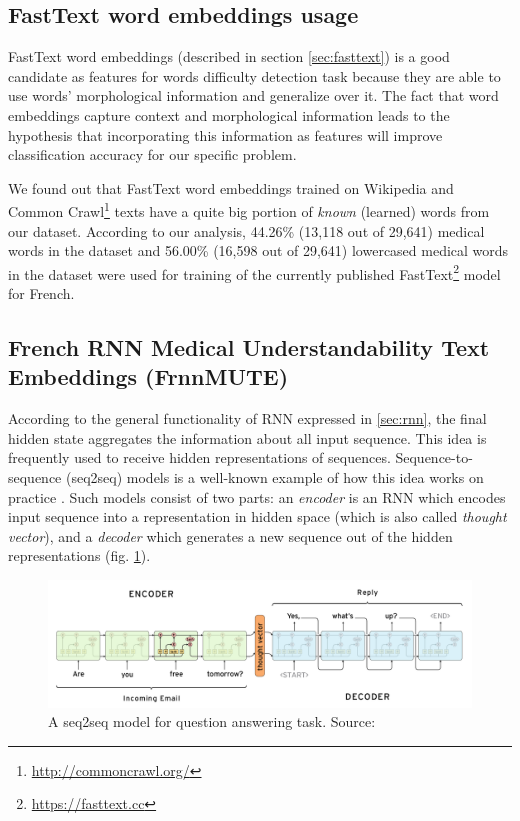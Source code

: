 \subsection{FastText word embeddings usage}

FastText word embeddings (described in section \ref{sec:fasttext}) is a good candidate as features for words difficulty detection task because they are able to use words' morphological information and generalize over it. The fact that word embeddings capture context and morphological information leads to the hypothesis that incorporating this information as features will improve classification accuracy for our specific problem. 

We found out that FastText word embeddings trained on Wikipedia and Common Crawl\footnote{\url{http://commoncrawl.org/}} texts have a quite big portion of \textit{known} (learned) words from our dataset.
According to our analysis, 44.26\% (13,118 out of 29,641) medical words in the dataset and 56.00\% (16,598 out of 29,641) lowercased medical words in the dataset were used for training of the currently published FastText\footnote{\url{https://fasttext.cc}} model for French.

\subsection{French RNN Medical Understandability Text Embeddings (FrnnMUTE)}
\label{sec:frnnmute-learning}

According to the general functionality of RNN expressed in \ref{sec:rnn}, the final hidden state aggregates the information about all input sequence. This idea is frequently used to receive hidden representations of sequences. Sequence-to-sequence (seq2seq) models is a well-known example of how this idea works on practice \citep{Sutskever-NIPS2014}. Such models consist of two parts: an \textit{encoder} is an RNN which encodes input sequence into a representation in hidden space (which is also called \textit{thought vector}), and a \textit{decoder} which generates a new sequence out of the hidden representations (fig. \ref{fig:seq2seq}). 

\begin{figure}[h]
    \centering
    \includegraphics[width=14cm]{Images/seq2seq.png}
    \caption{A seq2seq model for question answering task. Source: \citep{Britz-2016}}
    \label{fig:seq2seq}
\end{figure} 

